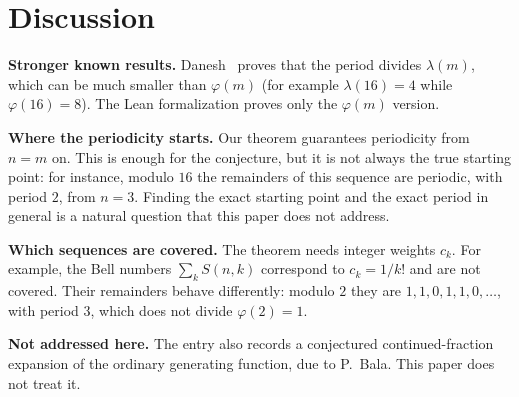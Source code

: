 \documentclass[11pt,a4paper]{article}
\theoremstyle{definition}
\theoremstyle{remark}
\newcommand{\para}[1]{\par\medskip\noindent\textbf{#1}\enspace}
\begin{document}
\section{Discussion}\label{sec:discussion}

\para{Stronger known results.} Danesh~\cite{danesh} proves that the period divides $\lambda(m)$, which can be much smaller
than $\varphi(m)$ (for example $\lambda(16)=4$ while $\varphi(16)=8$). The Lean formalization proves only the
$\varphi(m)$ version.

\para{Where the periodicity starts.} Our theorem guarantees periodicity from $n=m$ on. This is enough for the conjecture,
but it is not always the true starting point: for instance, modulo $16$ the remainders of this sequence are periodic, with period $2$, from $n=3$. Finding the exact starting point and the
exact period in general is a natural question that this paper does not address.

\para{Which sequences are covered.} The theorem needs integer weights $c_k$. For example, the Bell numbers
$\sum_kS(n,k)$ correspond to $c_k=1/k!$ and are not covered. Their remainders behave differently: modulo $2$ they are
$1,1,0,1,1,0,\dots$, with period $3$, which does not divide $\varphi(2)=1$.

\para{Not addressed here.} The entry also records a conjectured continued-fraction expansion of the ordinary generating
function, due to P.~Bala. This paper does not treat it.
\end{document}
